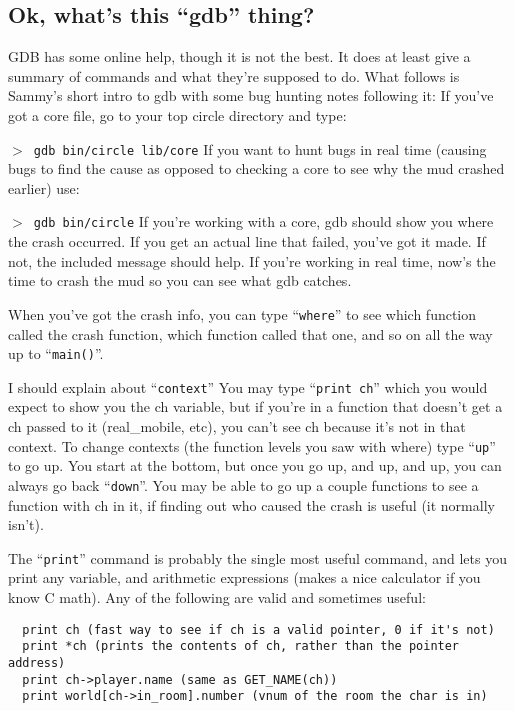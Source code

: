 \documentclass[11pt]{article}
\begin{document}
\subsection{Ok, what's this ``gdb'' thing?}
GDB has some online help, though it is not the best.  It does at least give a summary of commands and what they're supposed to do.  What follows is Sammy's short intro to gdb with some bug hunting notes following it:\newline
If you've got a core file, go to your top circle directory and type:\par
\texttt{$>$ gdb bin/circle lib/core}\newline
If you want to hunt bugs in real time (causing bugs to find the cause as opposed to checking a core to see why the mud crashed earlier) use:\par
\texttt{$>$ gdb bin/circle}\newline
If you're working with a core, gdb should show you where the crash occurred.  If you get an actual line that failed, you've got it made.  If not, the included message should help.  If you're working in real time, now's the time to crash the mud so you can see what gdb catches.
\par
When you've got the crash info, you can type ``\texttt{where}'' to see which function called the crash function, which function called that one, and so on all the way up to ``\texttt{main()}''.\par
I should explain about ``\texttt{context}''  You may type ``\texttt{print ch}'' which you would expect to show you the ch variable, but if you're in a function that doesn't get a ch passed to it (real\_mobile, etc), you can't see ch because it's not in that context.  To change contexts (the function
levels you saw with where) type ``\texttt{up}'' to go up.  You start at the bottom, but once you go up, and up, and up, you can always go back ``\texttt{down}''.  You may be able to go up a couple functions to see a function with ch in it, if finding out who caused the crash is useful (it normally isn't).
\par
The ``\texttt{print}'' command is probably the single most useful command, and lets you print any variable, and arithmetic expressions (makes a nice calculator if you know C math).  Any of the following are valid and sometimes useful:
\begin{verbatim}
  print ch (fast way to see if ch is a valid pointer, 0 if it's not)
  print *ch (prints the contents of ch, rather than the pointer address)
  print ch->player.name (same as GET_NAME(ch))
  print world[ch->in_room].number (vnum of the room the char is in)
\end{verbatim}
\end{document}
